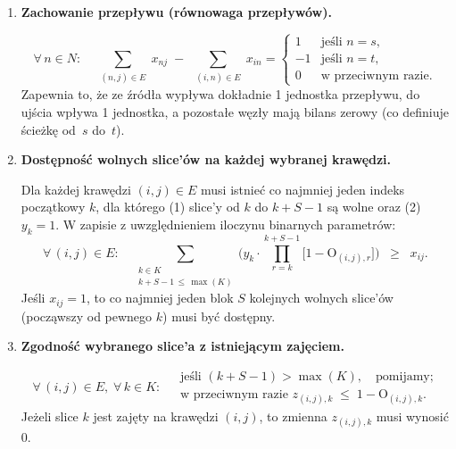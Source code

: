 \documentclass[12pt]{article}
\begin{document}
\begin{enumerate}
	\item \textbf{Zachowanie przepływu (równowaga przepływów).}

	      \[
		      \forall\, n \in N: \quad
		      \sum_{\substack{(n,j)\in E}} x_{n j}
		      \;-\;
		      \sum_{\substack{(i,n)\in E}} x_{i n}
		      =
		      \begin{cases}
			      1  & \text{jeśli } n = s,       \\
			      -1 & \text{jeśli } n = t,       \\
			      0  & \text{w przeciwnym razie}.
		      \end{cases}
	      \]
	      Zapewnia to, że ze źródła wypływa dokładnie 1 jednostka przepływu, do ujścia wpływa 1 jednostka, a pozostałe węzły mają bilans zerowy (co definiuje ścieżkę od \(\,s\) do \(\,t\)).

	      \vspace{1em}

	\item \textbf{Dostępność wolnych slice'ów na każdej wybranej krawędzi.}

	      Dla każdej krawędzi \((i,j)\in E\) musi istnieć co najmniej jeden indeks początkowy \(k\), dla którego (1) slice'y od \(k\) do \(k+S-1\) są wolne oraz (2) \(y_k=1\). W zapisie z uwzględnieniem iloczynu binarnych parametrów:
	      \[
		      \forall\,(i,j) \in E:\quad
		      \sum_{\substack{k \in K \\ k + S - 1 \,\le\, \max(K)}}
		      \Biggl(
		      y_k \cdot
		      \prod_{r = k}^{k + S - 1} \bigl[1 - \text{O}_{(i,j),r}\bigr]
		      \Biggr)
		      \;\;\ge\;\; x_{ij}.
	      \]
	      Jeśli \(x_{ij} = 1\), to co najmniej jeden blok \(S\) kolejnych wolnych slice'ów (począwszy od pewnego \(k\)) musi być dostępny.


	      \vspace{1em}

	\item \textbf{Zgodność wybranego slice'a z istniejącym zajęciem.}

	      \[
		      \forall\,(i,j)\in E,\;\forall\,k \in K: \;
		      \begin{aligned}
			       & \text{jeśli }(k + S - 1) > \max(K),\quad \text{pomijamy;}              \\
			       & \text{w przeciwnym razie } z_{(i,j),k} \;\le\; 1 - \text{O}_{(i,j),k}.
		      \end{aligned}
	      \]
	      Jeżeli slice \(k\) jest zajęty na krawędzi \((i,j)\), to zmienna \(z_{(i,j),k}\) musi wynosić 0.


\end{enumerate}
\end{document}
